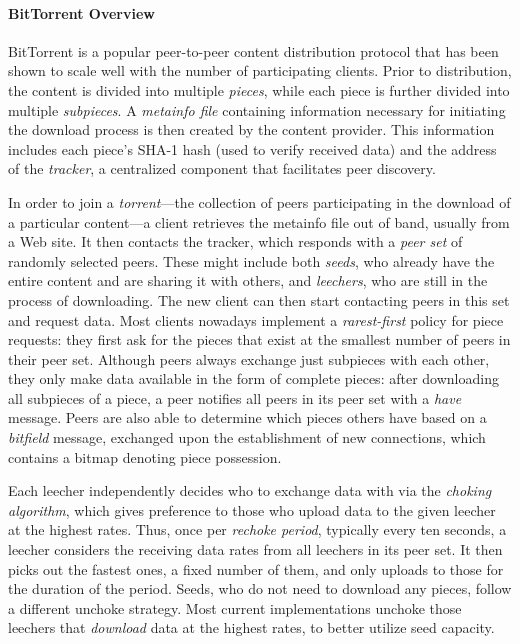 \documentclass[twocolumn,letterpaper,11pt]{article}
\begin{document}
\paragraph{BitTorrent Overview}

BitTorrent is a popular peer-to-peer content distribution protocol that has been shown 
to scale well with the number of participating clients. Prior to distribution, the
content is divided into multiple \textit{pieces}, while each piece is further 
divided into multiple \textit{subpieces}. A \textit{metainfo file} containing 
information necessary for initiating the download process is then created by the content 
provider. This information includes each piece's SHA-1 hash (used to verify
received data) and the address of the \textit{tracker}, 
a centralized component that facilitates peer discovery.

In order to join a \textit{torrent}---the collection of peers participating in the
download of a particular content---a client retrieves the metainfo file out of band, 
usually from a Web site. It then contacts the tracker, which responds 
with a \textit{peer set} of randomly selected peers. These might include both 
\textit{seeds}, who already have the entire content and are sharing it with others, 
and \textit{leechers}, who are still in the process of downloading.
The new client can then start contacting peers in this set and request data.
Most clients nowadays implement a \textit{rarest-first} policy for piece requests: 
they first ask for the pieces that exist at the smallest number of peers in their 
peer set. 
Although peers always exchange just subpieces with each other, they only
make data available in the form of complete pieces: after downloading
all subpieces of a piece, a peer notifies all peers in its peer set with a 
\textit{have} message.
Peers are also able to determine which pieces others have based on a 
\textit{bitfield} message, exchanged upon the establishment of new connections, which
contains a bitmap denoting piece possession.

Each leecher independently decides who to exchange data with via the
\textit{choking algorithm}, which gives preference to those who upload data to 
the given leecher at the highest rates. Thus, once per \textit{rechoke period}, 
typically every ten seconds, a leecher considers the receiving data rates from 
all leechers in its peer set. It then picks out the fastest ones, a fixed number of 
them, and only uploads to
those for the duration of the period. 
Seeds, who do not need to download any pieces, follow a different unchoke strategy. 
Most current implementations unchoke those leechers that \textit{download} data 
at the highest rates, to better utilize seed capacity.
\end{document}
